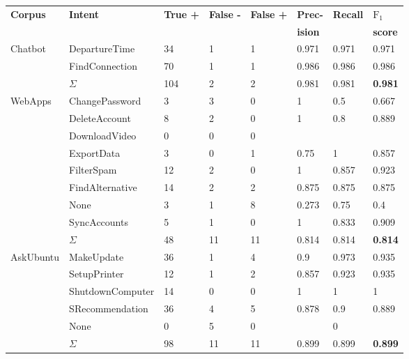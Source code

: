 \begin{center}
    \begin{tabular}{l l l l l l l l}
        \textbf{Corpus} & \textbf{Intent} & \textbf{True +} & \textbf{False -} & \textbf{False +} & \textbf{Prec-} & \textbf{Recall} & \textbf{$\text{F}_1$}\\
        & & & & & \textbf{ision} & & \textbf{score} \\
        \hline
        \multirow{3}{*}{Chatbot} & DepartureTime & 34 & 1 & 1 & 0.971 & 0.971 & 0.971 \\
        & FindConnection & 70 & 1 & 1 & 0.986 & 0.986 & 0.986 \\
        & $\Sigma$ & 104 & 2 & 2 & 0.981 & 0.981 & \textbf{0.981} \\
        \hline
        \multirow{9}{*}{WebApps} & ChangePassword & 3 & 3 & 0 & 1 & 0.5 & 0.667 \\
        & DeleteAccount & 8 & 2 & 0 & 1 & 0.8 & 0.889 \\
        & DownloadVideo & 0 & 0 & 0 & & &  \\
        & ExportData & 3 & 0 & 1 & 0.75 & 1 & 0.857 \\
        & FilterSpam & 12 & 2 & 0 & 1 & 0.857 & 0.923 \\
        & FindAlternative & 14 & 2 & 2 & 0.875 & 0.875 & 0.875 \\
        & None & 3 & 1 & 8 & 0.273 & 0.75 & 0.4  \\
        & SyncAccounts & 5 & 1 & 0 & 1 & 0.833 & 0.909 \\
        & $\Sigma$ & 48 & 11 & 11 & 0.814 & 0.814 & \textbf{0.814} \\
        \hline
        \multirow{6}{*}{AskUbuntu} & MakeUpdate & 36 & 1 & 4 & 0.9 & 0.973 & 0.935 \\
        & SetupPrinter & 12 & 1 & 2 & 0.857 & 0.923 & 0.935 \\
        & ShutdownComputer & 14 & 0 & 0 & 1 & 1 & 1 \\
        & SRecommendation & 36 & 4 & 5 & 0.878 & 0.9 & 0.889\\
        & None & 0 & 5 & 0 & & 0 & \\
        & $\Sigma$ & 98 & 11 & 11 & 0.899 & 0.899 & \textbf{0.899}\\
        \hline
    \end{tabular}
\end{center}
